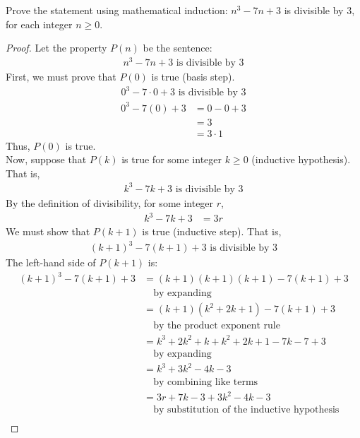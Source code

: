 \documentclass[name=Ojas\ Chaturvedi, emailid=oj.chaturvedi.2024, course=Capstone:\ Discrete\ Math, num=8, deadline={November\ 2,\ 2023}]{homework}
\begin{document}
Prove the statement using mathematical induction: $n^3 -7n +3$ is divisible by $3$, for each integer $n \geq 0$.
\begin{proof}
    Let the property $P(n)$ be the sentence:
    \begin{align*}
        n^3 -7n +3 \text{ is divisible by } 3
    \end{align*}
    First, we must prove that $P(0)$ is true (basis step).
    \begin{align*}
        0^3 -7 \cdot 0 +3 \text{ is divisible by } 3
    \end{align*}
    \begin{align*}
        0^3 -7(0) +3 &= 0 - 0 + 3 \\
        &= 3 \\
        &= 3 \cdot 1
    \end{align*}
    Thus, $P(0)$ is true. \\
    Now, suppose that $P(k)$ is true for some integer $k \geq 0$ (inductive hypothesis). That is,
    \begin{align*}
        k^3 -7k +3 \text{ is divisible by } 3
    \end{align*}
    By the definition of divisibility, for some integer $r$,
    \begin{align*}
        k^3 -7k +3 &= 3r
    \end{align*}
    We must show that $P(k+1)$ is true (inductive step). That is,
    \begin{align*}
        (k+1)^3 -7(k+1) +3 \text{ is divisible by } 3
    \end{align*}
    The left-hand side of $P(k+1)$ is:
    \begin{align*}
        (k+1)^3 -7(k+1) +3 &= (k+1)(k+1)(k+1) -7(k+1) +3 \\
        & \quad \text{by expanding} \\
        &= (k+1)(k^2 + 2k + 1) -7(k+1) +3 \\
        & \quad \text{by the product exponent rule} \\
        &= k^3 + 2k^2 + k + k^2 + 2k + 1 -7k -7 +3 \\
        & \quad \text{by expanding} \\
        &= k^3 + 3k^2 -4k -3 \\
        & \quad \text{by combining like terms} \\
        &= 3r + 7k - 3 + 3k^2 - 4k -3 \\
        & \quad \text{by substitution of the inductive hypothesis} \\

\end{align*}
\end{proof}
\end{document}
